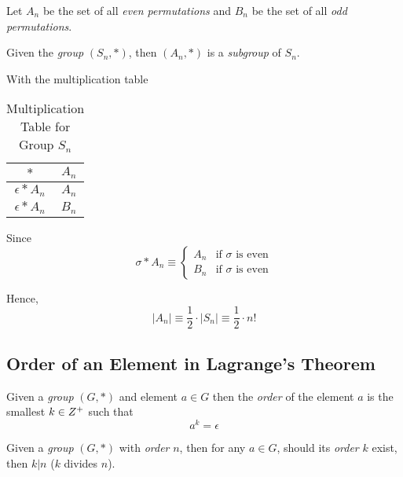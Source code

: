 \begin{remark}
    Let $A_n$ be the set of all \textit{even permutations} and $B_n$ be the set of all \textit{odd permutations}.
    
    Given the \textit{group} $(S_n, \ast)$, then $(A_n, \ast)$ is a \textit{subgroup} of $S_n$.
    
    With the multiplication table
    \begin{table}[H]
    \centering
    \begin{tabular}{c | c}
    \toprule
    $\ast$              & $A_n$ \\ 
    \midrule
    $\epsilon \ast A_n$ & $A_n$ \\
    $\epsilon \ast A_n$ & $B_n$ \\ 
    \bottomrule
    \end{tabular}
    \caption{Multiplication Table for Group $S_n$}
    \end{table}
    
    Since
    \begin{equation}
        \sigma \ast A_n \equiv \begin{cases}
            A_n &\text{if } \sigma \text{ is even} \\
            B_n &\text{if } \sigma \text{ is even}
        \end{cases}
    \end{equation}
    
    Hence,
    \begin{equation}
        \lvert A_n \rvert \equiv \frac{1}{2} \cdot \lvert S_n \rvert \equiv \frac{1}{2} \cdot n!
    \end{equation}
\end{remark}

\subsection{Order of an Element in Lagrange's Theorem}

\begin{definition}
    Given a \textit{group} $(G, \ast)$ and element $a \in G$ then the \textit{order} of the element $a$ is the smallest $k \in \relax{Z}^{+}$ such that
    \begin{equation}
        a^{k} = \epsilon
    \end{equation}
\end{definition}

\begin{proposition}
    Given a \textit{group} $(G, \ast)$ with \textit{order} $n$, then for any $a \in G$, should its \textit{order} $k$ exist, then $k \vert n$ ($k$ divides $n$).
\end{proposition}

